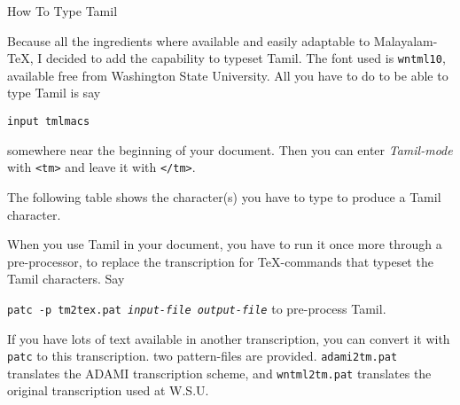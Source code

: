 



\beginsection How To Type Tamil

Because all the ingredients where available and easily adaptable to
Malayalam-\TeX, I decided to add the capability to typeset Tamil. The
font used is {\tt wntml10}, available free from Washington State
University. All you have to do to be able to type Tamil is say

\medskip
{\tt\bslash input tmlmacs}
\medskip

somewhere near the beginning of your document. Then you can enter
{\it Tamil-mode} with {\tt<{}tm>} and leave it with {\tt<{}/tm>}.

The following table shows the character(s) you have to type to produce
a Tamil character.

\bigskip

\bigskip

When you use Tamil in your document, you have to run it once more
through a pre-processor, to replace the transcription for \TeX-commands
that typeset the Tamil characters. Say

\medskip
{\tt patc -p tm2tex.pat {\it input-file output-file}}
\medskip
to pre-process Tamil.

If you
have lots of text available in another transcription, you can convert
it with {\tt patc} to this transcription. two pattern-files are
provided. {\tt adami2tm.pat} translates the ADAMI transcription scheme,
and {\tt wntml2tm.pat} translates the original transcription used
at W.S.U.

\endinput
